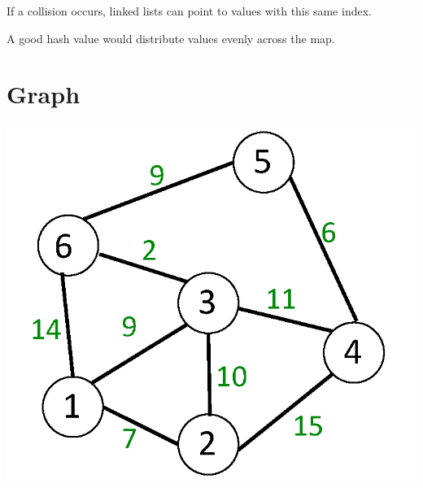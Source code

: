 \documentclass[11pt]{article}
\begin{document}
If a collision occurs, linked lists can point to values with this same index.

A good hash value would distribute values evenly across the map.

\section{Graph}
\begin{center}
    \includegraphics[width=200 px]{img/graph}  \\
\end{center}
\end{document}

